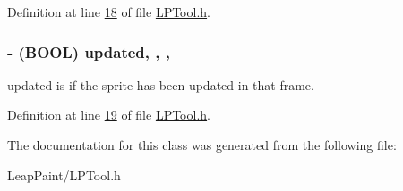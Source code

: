 Definition at line \hyperlink{_l_p_tool_8h_source_l00018}{18} of file \hyperlink{_l_p_tool_8h_source}{L\-P\-Tool.\-h}.

\hypertarget{interface_l_p_tool_a25dbad647c537177b138bdbbb01936e4}{
\subsubsection[{updated}]{\setlength{\rightskip}{0pt plus 5cm}-\/ (B\-O\-O\-L) updated\hspace{0.3cm}{\ttfamily [read]}, {\ttfamily [write]}, {\ttfamily [nonatomic]}, {\ttfamily [assign]}}}\label{d3/d2e/interface_l_p_tool_a25dbad647c537177b138bdbbb01936e4}
updated is if the sprite has been updated in that frame. 

Definition at line \hyperlink{_l_p_tool_8h_source_l00019}{19} of file \hyperlink{_l_p_tool_8h_source}{L\-P\-Tool.\-h}.



The documentation for this class was generated from the following file\-:\begin{DoxyCompactItemize}
\item 
Leap\-Paint/L\-P\-Tool.\-h\end{DoxyCompactItemize}
